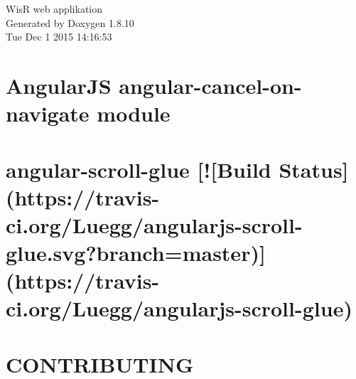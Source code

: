 \documentclass[twoside]{book}
\newcommand{\+}{\discretionary{\mbox{\scriptsize$\hookleftarrow$}}{}{}}
\newcommand{\clearemptydoublepage}{%
  \newpage{\pagestyle{empty}\cleardoublepage}%
}
\begin{document}
\hypersetup{pageanchor=false,
             bookmarks=true,
             bookmarksnumbered=true,
             pdfencoding=unicode
            }
\begin{titlepage}
\vspace*{7cm}
\begin{center}%
{\Large Wis\+R web applikation }\\
\vspace*{1cm}
{\large Generated by Doxygen 1.8.10}\\
\vspace*{0.5cm}
{\small Tue Dec 1 2015 14:16:53}\\
\end{center}
\end{titlepage}
\clearemptydoublepage
\tableofcontents
\clearemptydoublepage
{}
\hypersetup{pageanchor=true}

\chapter{Angular\+J\+S angular-\/cancel-\/on-\/navigate module}
\label{md__c_1__users_martin__documents__git_hub_visual_studio__bachelor__wis_r__wis_r_bower_components32bcec794ea1524187f4d7c40326415c}
\hypertarget{md__c_1__users_martin__documents__git_hub_visual_studio__bachelor__wis_r__wis_r_bower_components32bcec794ea1524187f4d7c40326415c}{}

\chapter{angular-\/scroll-\/glue \mbox{[}!\mbox{[}Build Status\mbox{]}(https\+://travis-\/ci.org/\+Luegg/angularjs-\/scroll-\/glue.svg?branch=master)\mbox{]}(https\+://travis-\/ci.org/\+Luegg/angularjs-\/scroll-\/glue)}
\label{md__c_1__users_martin__documents__git_hub_visual_studio__bachelor__wis_r__wis_r_bower_components13833aab6114b5cb5af6c9ab126220d4}
\hypertarget{md__c_1__users_martin__documents__git_hub_visual_studio__bachelor__wis_r__wis_r_bower_components13833aab6114b5cb5af6c9ab126220d4}{}

\chapter{C\+O\+N\+T\+R\+I\+B\+U\+T\+I\+N\+G}
\label{md__c_1__users_martin__documents__git_hub_visual_studio__bachelor__wis_r__wis_r_node_modules_grunt__c_o_n_t_r_i_b_u_t_i_n_g}
\hypertarget{md__c_1__users_martin__documents__git_hub_visual_studio__bachelor__wis_r__wis_r_node_modules_grunt__c_o_n_t_r_i_b_u_t_i_n_g}{}

\end{document}
